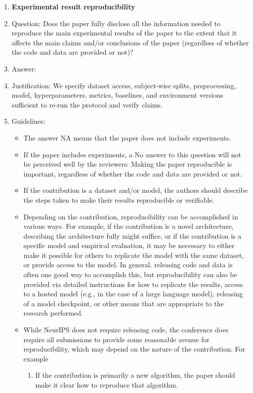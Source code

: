 \documentclass{article}
\begin{document}
\begin{enumerate}
    \item {\bf Experimental result reproducibility}
    \item[] Question: Does the paper fully disclose all the information needed to reproduce the main experimental results of the paper to the extent that it affects the main claims and/or conclusions of the paper (regardless of whether the code and data are provided or not)?
    \item[] Answer: \answerYes{}
    \item[] Justification: We specify dataset access, subject-wise splits, preprocessing, model, hyperparameters, metrics, baselines, and environment versions sufficient to re-run the protocol and verify claims.
    \item[] Guidelines:
    \begin{itemize}
        \item The answer NA means that the paper does not include experiments.
        \item If the paper includes experiments, a No answer to this question will not be perceived well by the reviewers: Making the paper reproducible is important, regardless of whether the code and data are provided or not.
        \item If the contribution is a dataset and/or model, the authors should describe the steps taken to make their results reproducible or verifiable. 
        \item Depending on the contribution, reproducibility can be accomplished in various ways. For example, if the contribution is a novel architecture, describing the architecture fully might suffice, or if the contribution is a specific model and empirical evaluation, it may be necessary to either make it possible for others to replicate the model with the same dataset, or provide access to the model. In general. releasing code and data is often one good way to accomplish this, but reproducibility can also be provided via detailed instructions for how to replicate the results, access to a hosted model (e.g., in the case of a large language model), releasing of a model checkpoint, or other means that are appropriate to the research performed.
        \item While NeurIPS does not require releasing code, the conference does require all submissions to provide some reasonable avenue for reproducibility, which may depend on the nature of the contribution. For example
        \begin{enumerate}
            \item If the contribution is primarily a new algorithm, the paper should make it clear how to reproduce that algorithm.

\end{enumerate}
\end{itemize}
\end{enumerate}
\end{document}
